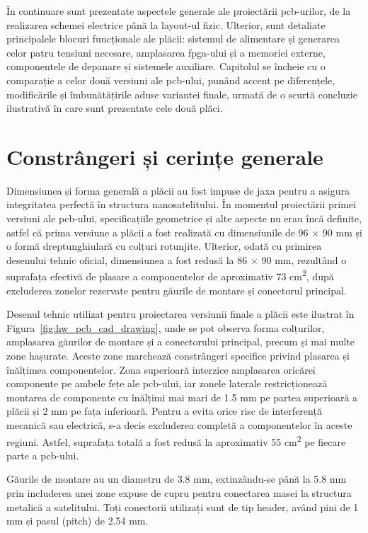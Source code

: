 \documentclass[12pt,a4paper]{report}
\begin{document}
În continuare sunt prezentate aspectele generale ale proiectării \gls{pcb}-urilor, de la realizarea schemei electrice până la layout-ul fizic. Ulterior, sunt detaliate principalele blocuri funcționale ale plăcii: sistemul de alimentare și generarea celor patru tensiuni necesare, amplasarea \gls{fpga}-ului și a memoriei externe, componentele de depanare și sistemele auxiliare. Capitolul se încheie cu o comparație a celor două versiuni ale \gls{pcb}-ului, punând accent pe diferențele, modificările și îmbunătățirile aduse variantei finale, urmată de o scurtă concluzie ilustrativă în care sunt prezentate cele două plăci.

\section{Constrângeri și cerințe generale}
Dimensiunea și forma generală a plăcii au fost impuse de \acrfull{jaxa} pentru a asigura integritatea perfectă în structura nanosatelitului. În momentul proiectării primei versiuni ale \gls{pcb}-ului, specificațiile geometrice și alte aspecte nu erau încă definite, astfel că prima versiune a plăcii a fost realizată cu dimensiunile de 96 $\times$ 90 mm și o formă dreptunghiulară cu colțuri rotunjite. Ulterior, odată cu primirea desenului tehnic oficial, dimensiunea a fost redusă la 86 $\times$ 90 mm, rezultând o suprafața efectivă de plasare a componentelor de aproximativ 73 cm\textsuperscript{2}, după excluderea zonelor rezervate pentru găurile de montare și conectorul principal.

Desenul tehnic utilizat pentru proiectarea versiunii finale a plăcii este ilustrat în Figura~\ref{fig:hw_pcb_cad_drawing}, unde se pot observa forma colțurilor, amplasarea găurilor de montare și a conectorului principal, precum și mai multe zone hașurate. Aceste zone marchează constrângeri specifice privind plasarea și înălțimea componentelor. Zona superioară interzice amplasarea oricărei componente pe ambele fețe ale \gls{pcb}-ului, iar zonele laterale restricționează montarea de componente cu înălțimi mai mari de 1.5 mm pe partea superioară a plăcii și 2 mm pe fața inferioară. Pentru a evita orice risc de interferență mecanică sau electrică, s-a decis excluderea completă a componentelor în aceste regiuni. Astfel, suprafața totală a fost redusă la aproximativ 55 cm\textsuperscript{2} pe fiecare parte a \gls{pcb}-ului.

Găurile de montare au un diametru de 3.8 mm, extinzându-se până la 5.8 mm prin includerea unei zone expuse de cupru pentru conectarea masei la structura metalică a satelitului. Toți conectorii utilizați sunt de tip header, având pini de 1 mm și pasul (pitch) de 2.54 mm.
\end{document}
